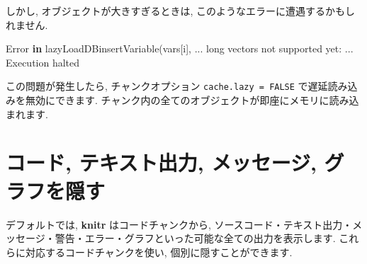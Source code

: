 \documentclass[
  11pt,
]{bxjsreport}
\newenvironment{Shaded}{\begin{snugshade}}{\end{snugshade}}
\newcommand{\ControlFlowTok}[1]{\textcolor[rgb]{0.13,0.29,0.53}{\textbf{#1}}}
\newcommand{\FunctionTok}[1]{\textcolor[rgb]{0.00,0.00,0.00}{#1}}
\newcommand{\NormalTok}[1]{#1}
\newcommand{\SpecialCharTok}[1]{\textcolor[rgb]{0.00,0.00,0.00}{#1}}
\begin{document}
しかし, オブジェクトが大きすぎるときは, このようなエラーに遭遇するかもしれません.

\begin{Shaded}
\begin{Highlighting}[]
\NormalTok{Error }\ControlFlowTok{in} \FunctionTok{lazyLoadDBinsertVariable}\NormalTok{(vars[i], ... }
\NormalTok{  long vectors not supported yet}\SpecialCharTok{:}\NormalTok{ ...}
\NormalTok{Execution halted}
\end{Highlighting}
\end{Shaded}

この問題が発生したら, チャンクオプション \texttt{cache.lazy = FALSE} で遅延読み込みを無効にできます. チャンク内の全てのオブジェクトが即座にメモリに読み込まれます.

\hypertarget{hide-one}{%
\section{コード, テキスト出力, メッセージ, グラフを隠す}\label{hide-one}}

デフォルトでは, \textbf{knitr} はコードチャンクから, ソースコード・テキスト出力・メッセージ・警告・エラー・グラフといった可能な全ての出力を表示します. これらに対応するコードチャンクを使い, 個別に隠すことができます.
\end{document}
